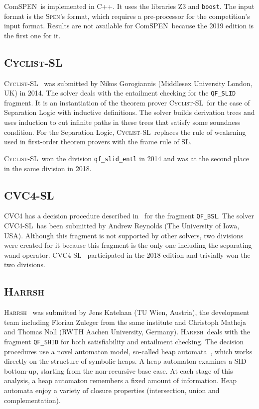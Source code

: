 \documentclass[orivec]{llncs}
\newcommand{\CYCLIST}{\textsc{Cyclist-SL}}
\newcommand{\ComSPEN}{Com\textsc{SPEN}}
\newcommand{\CVC}{\textsc{CVC4-SL}}
\newcommand{\HARRSH}{\textsc{Harrsh}}
\newcommand{\SPEN}{\textsc{Spen}}
\begin{document}
\ComSPEN\ is implemented in C++. It uses the libraries Z3 and \verb|boost|. The input format is the \SPEN's format, which requires a pre-processor for the competition's input format.
Results are not available for \ComSPEN\ because the 2019 edition is the first one for it.


\subsection{\CYCLIST}

\CYCLIST~\cite{BrotherstonGP12,CYCLISTsite} 
was submitted by 
Nikos Gorogiannis (Middlesex University London, UK) in 2014.
The solver deals with the entailment checking for the \verb|QF_SLID| fragment.
It is an instantiation of the theorem prover \CYCLIST\ for the case of Separation Logic with inductive definitions. 
The solver builds derivation trees and uses induction to cut infinite paths in these trees
that satisfy some soundness condition. 
For the Separation Logic, \CYCLIST\ replaces the rule of weakening used in first-order theorem provers with the frame rule of SL.

\CYCLIST\ won the division \verb|qf_slid_entl| in 2014 and was at the second place in the same division in 2018.


\subsection{\CVC}

CVC4 has a decision procedure described in~\cite{DBLP:conf/atva/ReynoldsIS016}
for the fragment \verb|QF_BSL|. The solver \CVC\ has been submitted by Andrew Reynolds (The University of Iowa, USA).
Although this fragment is not supported by other solvers, two divisions were created
for it because this fragment is the only one including the separating wand operator.
\CVC~\cite{CVC4SLsite} participated in the 2018 edition and trivially won the two divisions.


\subsection{\HARRSH}

\HARRSH~\cite{LPAR-IWIL2018:Harrsh_Tool_for_Unied} 
was submitted by Jens Katelaan (TU Wien, Austria), the development team
including Florian Zuleger from the same institute and 
Christoph Matheja and Thomas Noll (RWTH Aachen University, Germany).
\HARRSH\ deals with the fragment \verb|QF_SHID| for both satisfiability and entailment checking.  
The decision procedures use a novel automaton model, so-called heap automata~\cite{DBLP:conf/esop/JansenKMNZ17}, which works directly on the structure of symbolic heaps. A heap automaton examines a SID bottom-up, starting from the non-recursive base case. At each stage of this analysis, a heap automaton remembers a fixed amount of information. Heap automata enjoy a variety of closure properties (intersection, union and complementation).
\end{document}
